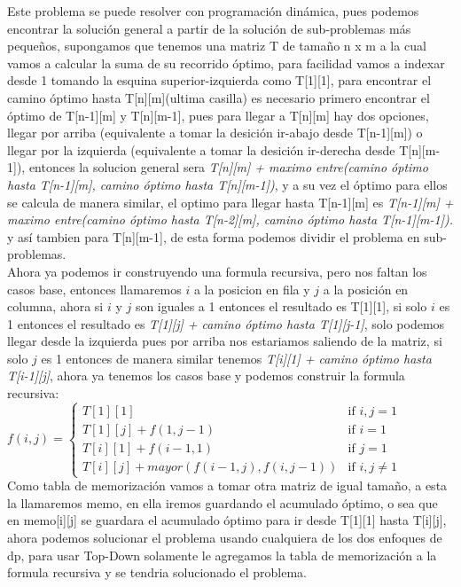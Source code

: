 \documentclass[12pt, a4paper]{article}
\newcommand\cppfile[2][]{

}
\begin{document}
	Este problema se puede resolver con programación dinámica, pues podemos encontrar la solución general a
	partir de la solución de sub-problemas más pequeños, supongamos	que tenemos una matriz T de tamaño n x m
	a la cual vamos a calcular la suma de su recorrido óptimo, para facilidad vamos a indexar desde 1 tomando
	la esquina superior-izquierda como T[1][1], para encontrar el camino óptimo hasta T[n][m](ultima casilla)
	es necesario primero encontrar el óptimo de T[n-1][m] y T[n][m-1], pues para llegar a T[n][m] hay dos opciones,
	llegar por arriba (equivalente a tomar la desición ir-abajo desde T[n-1][m]) o llegar por la izquierda 
	(equivalente a tomar la desición ir-derecha desde T[n][m-1]), entonces la solucion general sera 
	\textit{T[n][m] + maximo entre(camino óptimo hasta T[n-1][m], camino óptimo hasta T[n][m-1])}, y a su vez
	el óptimo para ellos se calcula de manera similar, el optimo para llegar hasta T[n-1][m] es 
	\textit{T[n-1][m] + maximo entre(camino óptimo hasta T[n-2][m], camino óptimo hasta T[n-1][m-1]).} y 
	así tambien para T[n][m-1], de esta forma podemos dividir el problema en sub-problemas.\\
	
	Ahora ya podemos ir construyendo una formula recursiva, pero nos faltan los casos base, entonces llamaremos
	$i$ a la posicion en fila y $j$ a la posición en columna, ahora si $i$ y $j$ son iguales a 1 entonces
	el resultado es T[1][1], si solo $i$ es 1 entonces el resultado es \textit{T[1][j] + camino óptimo hasta T[1][j-1]},
	solo podemos llegar desde la izquierda pues por arriba nos estariamos saliendo de la matriz, si solo $j$
	es 1 entonces de manera similar tenemos \textit{T[i][1] + camino óptimo hasta T[i-1][j]}, ahora ya tenemos
	los casos base y podemos construir la formula recursiva:\\
	$f(i, j) = 	
		\begin{cases}
			T[1][1] & \text{if $i,j = 1$}\\
			T[1][j] + f(1, j-1) & \text{if $i = 1$}\\
			T[i][1] + f(i-1, 1) & \text{if $j = 1$}\\
			T[i][j] + mayor(f(i-1, j), f(i, j-1)) & \text{if $i,j \neq 1$}
		\end{cases}
	$\\
	Como tabla de memorización vamos a tomar otra matriz de igual tamaño, a esta la llamaremos memo, en ella iremos
	guardando el acumulado óptimo, o sea que en memo[i][j] se guardara el acumulado óptimo para ir desde
	T[1][1] hasta T[i][j], ahora podemos solucionar el problema usando cualquiera de los dos enfoques de dp,
	para usar Top-Down solamente le agregamos la tabla de memorización a la formula recursiva y se tendria
	solucionado el problema.
	\cppfile[8-19]{codigos/matriz.cpp}
	
\end{document}
